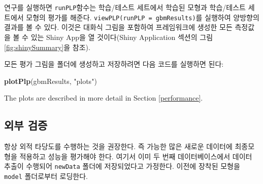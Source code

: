 \documentclass[11pt]{book}
\newenvironment{Shaded}{\begin{snugshade}}{\end{snugshade}}
\newcommand{\KeywordTok}[1]{\textcolor[rgb]{0.13,0.29,0.53}{\textbf{#1}}}
\newcommand{\StringTok}[1]{\textcolor[rgb]{0.31,0.60,0.02}{#1}}
\newcommand{\NormalTok}[1]{#1}
\theoremstyle{definition}
\theoremstyle{definition}
\theoremstyle{definition}
\theoremstyle{remark}
\begin{document}
연구를 실행하면 \texttt{runPLP}함수는 학습/테스트 세트에서 학습된 모형과
학습/테스트 세트에서 모형의 평가를 해준다.
\texttt{viewPLP(runPLP\ =\ gbmResults)}를 실행하여 양방향의 결과를 볼 수
있다. 이것은 대화식 그림을 포함하여 프레임워크에 생성한 모든 측정값을 볼
수 있는 Shiny App을 열 것이다(Shiny Application 섹션의 그림
\ref{fig:shinySummary}을 참조).

모든 평가 그림을 폴더에 생성하고 저장하려면 다음 코드를 실행하면 된다:

\begin{Shaded}
\begin{Highlighting}[]
\KeywordTok{plotPlp}\NormalTok{(gbmResults, }\StringTok{"plots"}\NormalTok{)}
\end{Highlighting}
\end{Shaded}

The plots are described in more detail in Section \ref{performance}.

\subsection{외부 검증}\label{-}

항상 외적 타당도를 수행하는 것을 권장한다. 즉 가능한 많은 새로운
데이터에 최종모형을 적용하고 성능을 평가해야 한다. 여기서 이미 두 번째
데이터베이스에서 데이터 추출이 수행되어 \texttt{newData} 폴더에
저장되었다고 가정한다. 이전에 장착된 모형을 \texttt{model} 폴더로부터
로딩한다.
\end{document}
